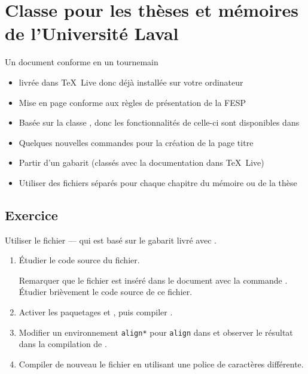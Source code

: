\chapter{Classe pour les thèses et mémoires de
  l'Université Laval}
\label{chap:ulthese}

Un document conforme en un tournemain

\begin{itemize}
\item {} livrée dans {\TeX}~Live donc déjà installée sur
  votre ordinateur
\item Mise en page conforme aux règles de présentation de la FESP
\item Basée sur la classe , donc les fonctionnalités de
  celle-ci sont disponibles dans 
\item Quelques nouvelles commandes pour la création de la page titre
\item Partir d'un gabarit (classés avec la documentation dans
  {\TeX}~Live)
\item Utiliser des fichiers séparés pour chaque chapitre du mémoire ou
  de la thèse
\end{itemize}



\section{Exercice}
\label{sec:ulthese:exercices}

\begin{exercice}
  Utiliser le fichier  --- qui est basé
  sur le gabarit  livré avec
  .
  \begin{enumerate}
  \item Étudier le code source du fichier.

    Remarquer que le fichier  est inséré
    dans le document avec la commande \verb==. Étudier
    brièvement le code source de ce fichier.
  \item Activer les paquetages  et , puis
    compiler .
  \item Modifier un environnement \texttt{align*} pour \texttt{align}
    dans  et observer le résultat dans la
    compilation de .
  \item Compiler de nouveau le fichier en utilisant une police de
    caractères différente.
  \end{enumerate}
\end{exercice}

